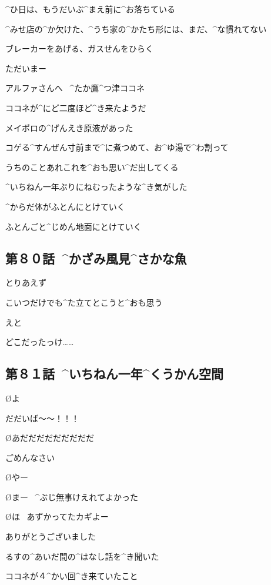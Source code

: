 \page
\A ^{ひ}{日}は、もうだいぶ^{まえ}{前}に^{お}{落}ちている

\page
\A ^{みせ}{店}の^{か}{欠}けた、^{うち}{家}の^{かたち}{形}には、まだ、^{な}{慣}れてない

\page
\A ブレーカーをあげる、ガスせんをひらく

\A ただいまー

\page
\Sign アルファさんへ
\ ^{たか}{鷹}^{つ}{津}ココネ

\page
\A ココネが^{にど}{二度}ほど^{き}{来}たようだ

\page[37]
\A メイポロの^{げんえき}{原液}があった

\A コゲる^{すんぜん}{寸前}まで^{に}{煮}つめて、お^{ゆ}{湯}で^{わ}{割}って

\A うちのことあれこれを^{おも}{思}い^{だ}{出}してくる

\page[41]
\A ^{いちねん}{一年}ぶりにねむったような^{き}{気}がした

\A ^{からだ}{体}がふとんにとけていく

\page
\A ふとんごと^{じめん}{地面}にとけていく


\subsection{第８０話\ ^{かざみ}{風見}^{さかな}{魚}}

\page[46]
\A とりあえず

\page
\A こいつだけでも^{た}{立}てとこうと^{おも}{思}う

\A えと

\A どこだったっけ……


\subsection{第８１話\ ^{いちねん}{一年}^{くうかん}{空間}}

\page[56]
\O よ

\A だだいば〜〜！！！

\O あだだだだだだだだだ

\page
\A ごめんなさい

\O やー

\O まー
\ ^{ぶじ}{無事}けえれてよかった

\O ほ
\ あずかってたカギよー

\A ありがとうございました

\page
\A るすの^{あいだ}{間}の^{はなし}{話}を^{き}{聞}いた

\A ココネが４^{かい}{回}^{き}{来}ていたこと

